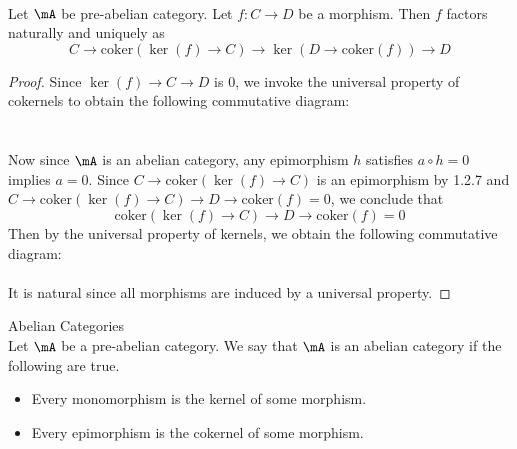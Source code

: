 \documentclass[a4paper]{article}
\begin{document}
\begin{lmm}{}{}\\
Let $\mA$ be pre-abelian category. Let $f:C\to D$ be a morphism. Then $f$ factors naturally and uniquely as $$C\to\text{coker}(\ker(f)\to C)\to\ker(D\to\text{coker}(f))\to D$$
\begin{proof}
Since $\ker(f)\to C\to D$ is $0$, we invoke the universal property of cokernels to obtain the following commutative diagram: \\
 \\~\\
Now since $\mA$ is an abelian category, any epimorphism $h$ satisfies $a\circ h=0$ implies $a=0$. Since $C\to\text{coker}(\ker(f)\to C)$ is an epimorphism by 1.2.7 and $C\to\text{coker}(\ker(f)\to C)\to D\to\text{coker}(f)=0$, we conclude that $$\text{coker}(\ker(f)\to C)\to D\to\text{coker}(f)=0$$ Then by the universal property of kernels, we obtain the following commutative diagram: \\
 \\
It is natural since all morphisms are induced by a universal property. 
\end{proof}
\end{lmm}

\begin{defn}{Abelian Categories}{}\\
Let $\mA$ be a pre-abelian category. We say that $\mA$ is an abelian category if the following are true. 
\begin{itemize}
\item Every monomorphism is the kernel of some morphism. 
\item Every epimorphism is the cokernel of some morphism. 
\end{itemize}
\end{defn}
\end{document}
